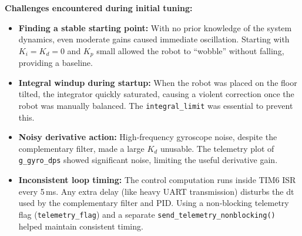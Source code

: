\documentclass[12pt,a4paper]{article}
\begin{document}
\begin{enumerate}[leftmargin=*, label=\textbf{Q\arabic*}]
		\textbf{Challenges encountered during initial tuning:}
		\begin{itemize}
			\item \textbf{Finding a stable starting point:} With no prior knowledge of 
			the system dynamics, even moderate gains caused immediate oscillation. 
			Starting with $K_i=K_d=0$ and $K_p$ small allowed the robot to “wobble” 
			without falling, providing a baseline.
			\item \textbf{Integral windup during startup:} When the robot was placed on 
			the floor tilted, the integrator quickly saturated, causing a violent 
			correction once the robot was manually balanced. The \texttt{integral\_limit} 
			was essential to prevent this.
			\item \textbf{Noisy derivative action:} High‑frequency gyroscope noise, 
			despite the complementary filter, made a large $K_d$ unusable. The telemetry 
			plot of \texttt{g\_gyro\_dps} showed significant noise, limiting the useful 
			derivative gain.
			\item \textbf{Inconsistent loop timing:} The control computation runs inside 
			TIM6 ISR every 5\,ms. Any extra delay (like heavy UART transmission) 
			disturbs the dt used by the complementary filter and PID. Using a 
			non‑blocking telemetry flag (\texttt{telemetry\_flag}) and a separate 
			\texttt{send\_telemetry\_nonblocking()} helped maintain consistent timing.
		\end{itemize}
		

\end{enumerate}
\end{document}
